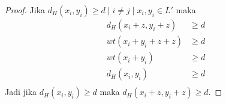 \documentclass[conference,compsoc]{IEEEtran}
\begin{document}
\begin{proof}
Jika $d_H(x_i,y_i) \ge d \mid i \neq j \mid x_i,y_i \in L'$ maka
\begin{align*}
d_H(x_i+z,y_i+z) &\ge d \\
wt(x_i+y_i+z+z) &\ge d \\
wt(x_i+y_i) &\ge d \\
d_H(x_i,y_i) &\ge d \\
\end{align*}
Jadi jika $d_H(x_i,y_i) \ge d$ maka $d_H(x_i+z,y_i+z) \ge d$.
\end{proof}




\end{document}
